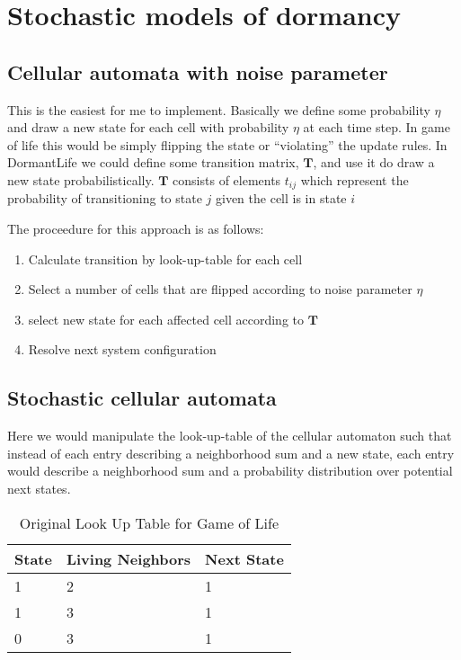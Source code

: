 \documentclass[12pt]{article}
\begin{document}
\section{Stochastic models of dormancy}

\subsection{Cellular automata with noise parameter}

This is the easiest for me to implement. Basically we define some probability
$\eta$ and draw a new state for each cell with probability $\eta$ at each time
step. In game of life this would be simply flipping the state or ``violating''
the update rules. In DormantLife we could define some transition matrix, 
$\mathbf{T}$, and use it do draw a new state probabilistically. $\mathbf{T}$
consists of elements $t_{ij}$ which represent the probability of transitioning
to state $j$ given the cell is in state $i$

The proceedure for this approach is as follows:
\begin{enumerate}
    \item Calculate transition by look-up-table for each cell
    \item Select a number of cells that are flipped according to noise parameter
    $\eta$
    \item select new state for each affected cell according to $\mathbf{T}$
    \item Resolve next system configuration
\end{enumerate}

\subsection{Stochastic cellular automata}

Here we would manipulate the look-up-table of the cellular automaton such that
instead of each entry describing a neighborhood sum and a new state, each entry
would describe a neighborhood sum and a probability distribution over potential
next states.

\begin{table}[h]
    \centering
    \caption{Original Look Up Table for Game of Life}
    \begin{tabular}{|l|l|l|} 
    \hline
    State & Living Neighbors & Next State  \\ 
    \hline
    1     & 2                & 1           \\ 
    \hline
    1     & 3                & 1           \\ 
    \hline
    0     & 3                & 1           \\
    \hline
    \end{tabular}
\end{table}
\end{document}
